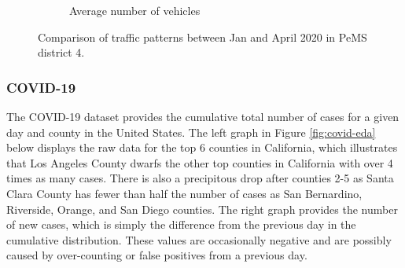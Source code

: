 \documentclass{article}
\begin{document}
\begin{figure}[hbt!]
\begin{subfigure}[b]{0.48\textwidth}
        \caption{Average number of vehicles}
        \label{fig:traffic-eda-month-flow}
    \end{subfigure}
    \caption{Comparison of traffic patterns between Jan and April 2020 in PeMS district 4.}
    \label{fig:traffic-eda-month}
\end{figure}

\subsubsection{COVID-19}

The COVID-19 dataset provides the cumulative total number of cases for a given day and county in the United States. The left graph in Figure \ref{fig:covid-eda} below displays the raw data for the top 6 counties in California, which illustrates that Los Angeles County dwarfs the other top counties in California with over 4 times as many cases. There is also a precipitous drop after counties 2-5 as Santa Clara County has fewer than half the number of cases as San Bernardino, Riverside, Orange, and San Diego counties. The right graph provides the number of new cases, which is simply the difference from the previous day in the cumulative distribution. These values are occasionally negative and are possibly caused by over-counting or false positives from a previous day. 
\end{document}
